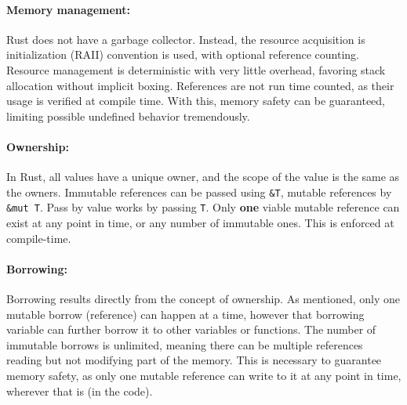 \paragraph{Memory management:}\label{sec:memmanage}
Rust does not have a garbage collector. Instead, the resource acquisition is
initialization (RAII) convention is used, with optional reference counting.
Resource management is deterministic with very little overhead, favoring stack
allocation without implicit boxing. References are not run time counted, as
their usage is verified at compile time. With this, memory safety can be
guaranteed, limiting possible undefined behavior tremendously.


\paragraph{Ownership:}\label{sec:ownership}
In Rust, all values have a unique owner, and the scope of the value is the same
as the owners. Immutable references can be passed using \verb|&T|, mutable
references by \verb|&mut T|. Pass by value works by passing \verb|T|. Only
\textbf{one} viable mutable reference can exist at any point in time, or any
number of immutable ones. This is enforced at compile-time.

\newpage
\paragraph{Borrowing:}\label{sec:borrowing}
Borrowing results directly from the concept of ownership. As mentioned, only one mutable
borrow (reference) can happen at a time, however that borrowing variable can
further borrow it to other variables or functions. The number of immutable
borrows is unlimited, meaning there can be multiple references reading but not
modifying part of the memory. This is necessary to guarantee memory safety, as
only one mutable reference can write to it at any point in time, wherever that
is (in the code).

